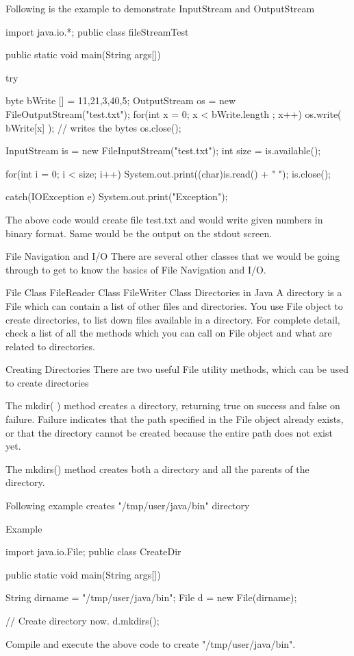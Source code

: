 Following is the example to demonstrate InputStream and OutputStream

import java.io.*;
public class fileStreamTest {

   public static void main(String args[]) {

      try {
         byte bWrite [] = {11,21,3,40,5};
         OutputStream os = new FileOutputStream("test.txt");
         for(int x = 0; x < bWrite.length ; x++) {
            os.write( bWrite[x] );   // writes the bytes
         }
         os.close();

         InputStream is = new FileInputStream("test.txt");
         int size = is.available();

         for(int i = 0; i < size; i++) {
            System.out.print((char)is.read() + "  ");
         }
         is.close();
      }catch(IOException e) {
         System.out.print("Exception");
      }
   }
}
The above code would create file test.txt and would write given numbers in binary format. Same would be the output on the stdout screen.

File Navigation and I/O
There are several other classes that we would be going through to get to know the basics of File Navigation and I/O.

File Class
FileReader Class
FileWriter Class
Directories in Java
A directory is a File which can contain a list of other files and directories. You use File object to create directories, to list down files available in a directory. For complete detail, check a list of all the methods which you can call on File object and what are related to directories.

Creating Directories
There are two useful File utility methods, which can be used to create directories

The mkdir( ) method creates a directory, returning true on success and false on failure. Failure indicates that the path specified in the File object already exists, or that the directory cannot be created because the entire path does not exist yet.

The mkdirs() method creates both a directory and all the parents of the directory.

Following example creates "/tmp/user/java/bin" directory

Example

import java.io.File;
public class CreateDir {

   public static void main(String args[]) {
      String dirname = "/tmp/user/java/bin";
      File d = new File(dirname);

      // Create directory now.
      d.mkdirs();
   }
}
Compile and execute the above code to create "/tmp/user/java/bin".

